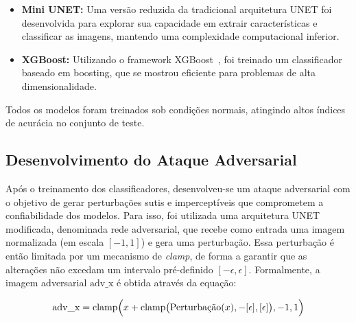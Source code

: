\documentclass[12pt]{article}
\begin{document}
\begin{itemize}
  \item \textbf{Mini UNET:} Uma versão reduzida da tradicional arquitetura UNET foi
        desenvolvida para explorar sua capacidade em extrair características e classificar as
        imagens, mantendo uma complexidade computacional inferior.

  \item \textbf{XGBoost:} Utilizando o framework XGBoost~\cite{Chen_2016}, foi treinado
        um classificador baseado em boosting, que se mostrou eficiente para problemas de alta
        dimensionalidade.
\end{itemize}

Todos os modelos foram treinados sob condições normais, atingindo altos índices
de acurácia no conjunto de teste.

\subsection{Desenvolvimento do Ataque Adversarial}

Após o treinamento dos classificadores, desenvolveu-se um ataque adversarial
com o objetivo de gerar perturbações sutis e imperceptíveis que comprometem a
confiabilidade dos modelos. Para isso, foi utilizada uma arquitetura UNET
modificada, denominada rede adversarial, que recebe como entrada uma imagem
normalizada (em escala \([-1, 1]\)) e gera uma perturbação. Essa perturbação é
então limitada por um mecanismo de \textit{clamp}, de forma a garantir que as
alterações não excedam um intervalo pré-definido \([-\epsilon, \epsilon]\).
Formalmente, a imagem adversarial \( \text{adv\_x} \) é obtida através da
equação:

\[
  \text{adv\_x} = \text{clamp}\Bigl(x + \text{clamp}\bigl(\text{Perturbação}(x), -[\epsilon], [\epsilon]\bigr), -1, 1\Bigr)
\]
\end{document}
